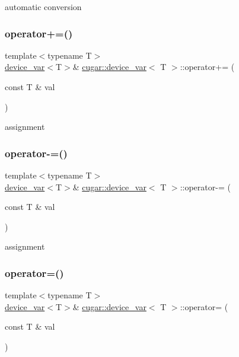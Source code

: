 automatic conversion \mbox{\label{group___basic_ga95f15b09320e473fc50c4df310d535fe}} 
\subsubsection{\texorpdfstring{operator+=()}{operator+=()}}
{\footnotesize\ttfamily template$<$typename T$>$ \\
\hyperlink{structcugar_1_1device__var}{device\+\_\+var}$<$T$>$\& \hyperlink{structcugar_1_1device__var}{cugar\+::device\+\_\+var}$<$ T $>$\+::operator+= (\begin{DoxyParamCaption}\item[{const T \&}]{val }\end{DoxyParamCaption})\hspace{0.3cm}{\ttfamily [inline]}}

assignment \mbox{\label{group___basic_ga882c904bab742504bd555bd688ddcd07}} 
\subsubsection{\texorpdfstring{operator-\/=()}{operator-=()}}
{\footnotesize\ttfamily template$<$typename T$>$ \\
\hyperlink{structcugar_1_1device__var}{device\+\_\+var}$<$T$>$\& \hyperlink{structcugar_1_1device__var}{cugar\+::device\+\_\+var}$<$ T $>$\+::operator-\/= (\begin{DoxyParamCaption}\item[{const T \&}]{val }\end{DoxyParamCaption})\hspace{0.3cm}{\ttfamily [inline]}}

assignment \mbox{\label{group___basic_ga760fb65c25c56b5fa9f49144f1da3f9b}} 
\subsubsection{\texorpdfstring{operator=()}{operator=()}}
{\footnotesize\ttfamily template$<$typename T$>$ \\
\hyperlink{structcugar_1_1device__var}{device\+\_\+var}$<$T$>$\& \hyperlink{structcugar_1_1device__var}{cugar\+::device\+\_\+var}$<$ T $>$\+::operator= (\begin{DoxyParamCaption}\item[{const T \&}]{val }\end{DoxyParamCaption})\hspace{0.3cm}{\ttfamily [inline]}}

